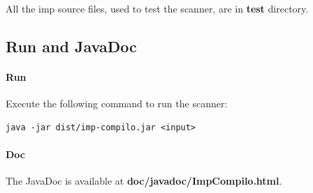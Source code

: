 \documentclass[letterpaper]{article}
\begin{document}
All the imp source files, used to test the scanner,
are in \textbf{test} directory.

\subsection{Run and JavaDoc}

\paragraph{Run}
Execute the following command to run the scanner:
\begin{lstlisting}[frame=single]
java -jar dist/imp-compilo.jar <input>
\end{lstlisting}
\paragraph{Doc}

The JavaDoc is available at \textbf{doc/javadoc/ImpCompilo.html}.
\end{document}
